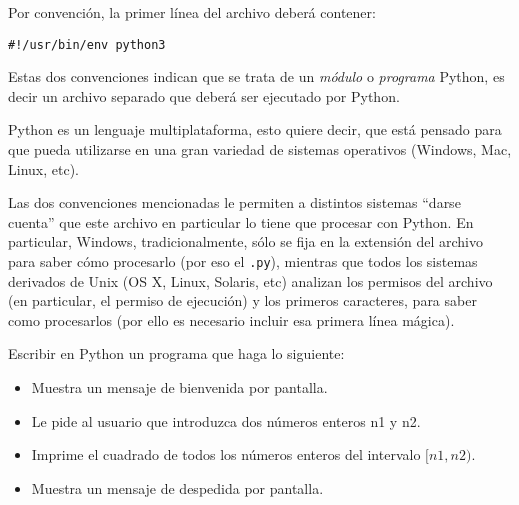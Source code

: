 Por convención, la primer línea del archivo deberá contener:

\begin{verbatim}
#!/usr/bin/env python3
\end{verbatim}


Estas dos convenciones indican que se trata de un {\it módulo} o {\it programa}
Python, es decir un archivo separado que deberá ser ejecutado por Python.

\begin{sabias_que}
Python es un lenguaje multiplataforma, esto quiere decir, que está pensado
para que pueda utilizarse en una gran variedad de sistemas operativos
(Windows, Mac, Linux, etc).

Las dos convenciones mencionadas le permiten a distintos sistemas ``darse
cuenta'' que este archivo en particular lo tiene que procesar con Python.
En particular, Windows, tradicionalmente, sólo se fija en la extensión del
archivo para saber cómo procesarlo (por eso el \verb!.py!), mientras que
todos los sistemas derivados de Unix (OS X, Linux, Solaris, etc) analizan
los permisos del archivo (en particular, el permiso de ejecución) y los
primeros caracteres, para saber como procesarlos (por ello es necesario
incluir esa primera línea mágica).
\end{sabias_que}

\begin{problema}
Escribir en Python un programa que haga lo siguiente:

\begin{itemize}
\item Muestra un mensaje de bienvenida por pantalla.
\item Le pide al usuario que introduzca dos números enteros n1 y n2.
\item Imprime el cuadrado de todos los números enteros del intervalo $[n1, n2)$.
\item Muestra un mensaje de despedida por pantalla.
\end{itemize}
\end{problema}

